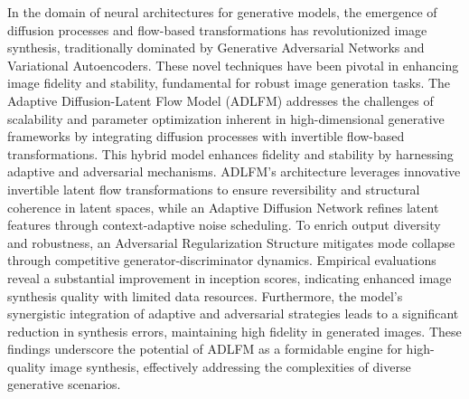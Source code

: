 

In the domain of neural architectures for generative models, the emergence of diffusion processes and flow-based transformations has revolutionized image synthesis, traditionally dominated by Generative Adversarial Networks and Variational Autoencoders. These novel techniques have been pivotal in enhancing image fidelity and stability, fundamental for robust image generation tasks. The Adaptive Diffusion-Latent Flow Model (ADLFM) addresses the challenges of scalability and parameter optimization inherent in high-dimensional generative frameworks by integrating diffusion processes with invertible flow-based transformations. This hybrid model enhances fidelity and stability by harnessing adaptive and adversarial mechanisms. ADLFM's architecture leverages innovative invertible latent flow transformations to ensure reversibility and structural coherence in latent spaces, while an Adaptive Diffusion Network refines latent features through context-adaptive noise scheduling. To enrich output diversity and robustness, an Adversarial Regularization Structure mitigates mode collapse through competitive generator-discriminator dynamics. Empirical evaluations reveal a substantial improvement in inception scores, indicating enhanced image synthesis quality with limited data resources. Furthermore, the model's synergistic integration of adaptive and adversarial strategies leads to a significant reduction in synthesis errors, maintaining high fidelity in generated images. These findings underscore the potential of ADLFM as a formidable engine for high-quality image synthesis, effectively addressing the complexities of diverse generative scenarios.
